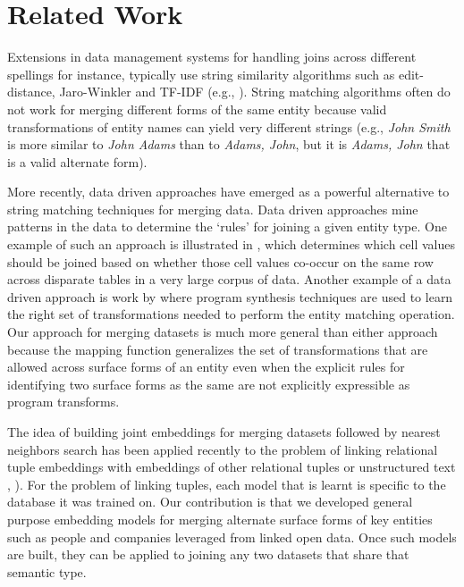 \section{Related Work}
Extensions in data management systems for handling joins across different spellings for instance, typically use string similarity algorithms such as edit-distance, Jaro-Winkler and TF-IDF (e.g., \cite{Cohen2003}).  String matching algorithms often do not work for merging different forms of the same entity because valid transformations of entity names can yield very different strings (e.g., \textit{John Smith} is more similar to \textit{John Adams} than to \textit{Adams, John}, but it is \textit{Adams, John} that is a valid alternate form).

More recently, data driven approaches have emerged as a powerful alternative to string matching techniques for merging data.  Data driven approaches mine patterns in the data to determine the `rules' for joining a given entity type.  One example of such an approach is illustrated in \cite{He:2015:SJS:2824032.2824036}, which determines which cell values should be joined based on whether those cell values co-occur on the same row across disparate tables in a very large corpus of data.  Another example of a data driven approach is work by \cite{auto-join-joining-tables-leveraging-transformations} where program synthesis techniques are used to learn the right set of transformations needed to perform the entity matching operation.  Our approach for merging datasets is much more general than either approach because the mapping function generalizes the set of transformations that are allowed across surface forms of an entity even when the explicit rules for identifying two surface forms as the same are not explicitly expressible as program transforms.

The idea of building joint embeddings for merging datasets followed by nearest neighbors search has been applied recently to the problem of linking relational tuple embeddings with embeddings of other relational tuples or unstructured text \cite{Bordawekar18}, \cite{IDEL18}).  For the problem of linking tuples, each model that is learnt is specific to the database it was trained on.  Our contribution is that we developed general purpose embedding models for merging alternate surface forms of key entities such as people and companies leveraged from linked open data.  Once such models are built, they can be applied to joining any two datasets that share that semantic type.

